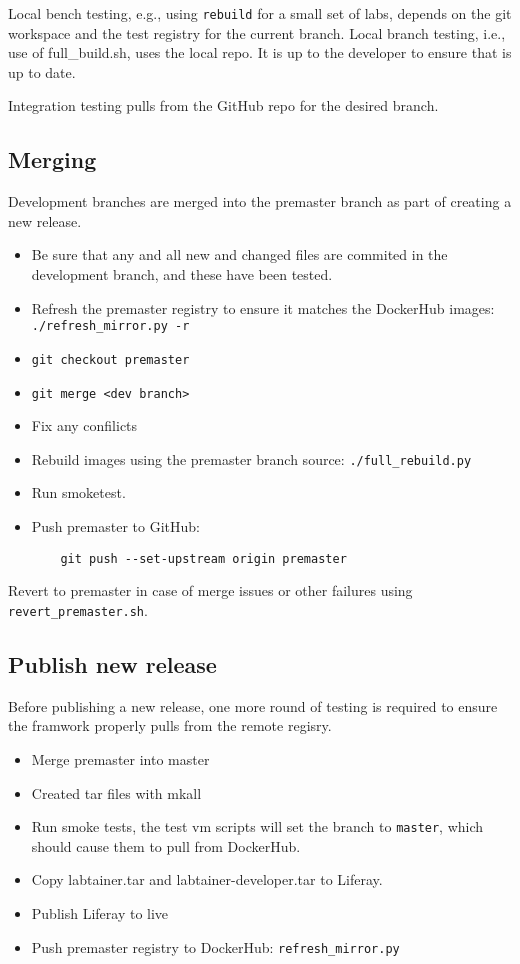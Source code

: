 \documentclass[12pt]{article}
\begin{document}
Local bench testing, e.g., using {\tt rebuild} for a small set of labs, depends on the git workspace and the test registry for the current branch.
Local branch testing, i.e., use of full\_build.sh, uses the local repo.  It is up to the developer to ensure that is up to date.

Integration testing pulls from the GitHub repo for the desired branch.


\subsection{Merging}
Development branches are merged into the premaster branch as part of creating a new release.
\begin{itemize}
\item Be sure that any and all new and changed files are commited in the development branch, and these have been tested.
\item Refresh the premaster registry to ensure it matches the DockerHub images: {\tt ./refresh\_mirror.py -r}
\item {\tt git checkout premaster}
\item {\tt git merge <dev branch>}
\item Fix any confilicts
\item Rebuild images using the premaster branch source: {\tt ./full\_rebuild.py}
\item Run smoketest.
\item Push premaster to GitHub: 
\begin{verbatim}
    git push --set-upstream origin premaster
\end{verbatim}
\end{itemize}

Revert to premaster in case of merge issues or other failures using {\tt revert\_premaster.sh}.

\subsection{Publish new release}
Before publishing a new release, one more round of testing is required to ensure the framwork properly pulls from the remote regisry.
\begin{itemize}
\item Merge premaster into master
\item Created tar files with mkall
\item Run smoke tests, the test vm scripts will set the branch to {\tt master}, which should cause them to pull from DockerHub.
\item Copy labtainer.tar and labtainer-developer.tar to Liferay.
\item Publish Liferay to live
\item Push premaster registry to DockerHub: {\tt refresh\_mirror.py}
\end{itemize}
\end{document}
